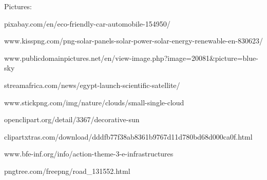 \documentclass[11pt]{article}
\begin{document}
Pictures:

pixabay.com/en/eco-friendly-car-automobile-154950/

www.kisspng.com/png-solar-panels-solar-power-solar-energy-renewable-en-830623/

www.publicdomainpictures.net/en/view-image.php?image=20081\&picture=blue-sky

streamafrica.com/news/egypt-launch-scientific-satellite/

www.stickpng.com/img/nature/clouds/small-single-cloud

openclipart.org/detail/3367/decorative-sun

clipartxtras.com/download/dddfb77f38ab8361b9767d11d780bd68d000ca0f.html

www.bfe-inf.org/info/action-theme-3-e-infrastructures

pngtree.com/freepng/road\_131552.html
\end{document}
